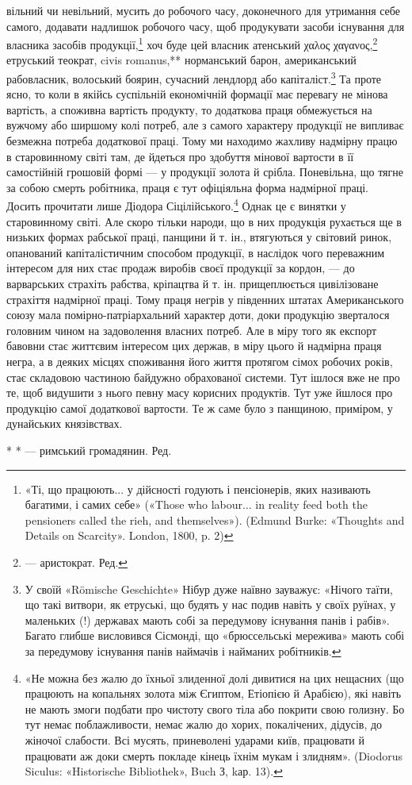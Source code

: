 \parcont{}  %
вільний чи невільний, мусить до робочого часу, доконечного для
утримання себе самого, додавати надлишок робочого часу, щоб
продукувати засоби існування для власника засобів продукції,\footnote{
«Ті, що працюють... у дійсності годують і пенсіонерів, яких називають
багатими, і самих себе» («Those who labour... in reality feed both
the pensioners called the rieh, and themselves»). (Edmund Burke: «Thoughts and
Details on Scarcity». London, 1800, p. 2)
}
хоч буде цей власник атенський χαλος χαγανος,\footnote*{
— аристократ. Ред.
} етруський теократ,
civis romanus,** норманський барон, американський рабовласник,
волоський боярин, сучасний лендлорд або капіталіст.\footnote{
У своїй «Römische Geschichte» Нібур дуже наївно зауважує: «Нічого
таїти, що такі витвори, як етруські, що будять у нас подив навіть у
своїх руїнах, у маленьких (!) державах мають собі за передумову існування
панів і рабів». Багато глибше висловився Сісмонді, що «брюссельські
мережива» мають собі за передумову існування панів наймачів і найманих
робітників.
}
Та проте ясно, то коли в якійсь суспільній економічній формації
має перевагу не мінова вартість, а споживна вартість продукту,
то додаткова праця обмежується на вужчому або ширшому колі
потреб, але з самого характеру продукції не випливає безмежна
потреба додаткової праці. Тому ми находимо жахливу надмірну
працю в старовинному світі там, де йдеться про здобуття мінової
вартости в її самостійній грошовій формі — у продукції золота
й срібла. Поневільна, що тягне за собою смерть робітника, праця
є тут офіціяльна форма надмірної праці. Досить прочитати лише
Діодора Сіцілійського.\footnote{
«Не можна без жалю до їхньої злиденної долі дивитися на цих нещасних
(що працюють на копальнях золота між Єгиптом, Етіопією й
Арабією), які навіть не мають змоги подбати про чистоту свого тіла або
покрити свою голизну. Бо тут немає поблажливости, немає жалю до
хорих, покалічених, дідусів, до жіночої слабости. Всі мусять, приневолені
ударами київ, працювати й працювати аж доки смерть покладе кінець
їхнім мукам і злидням». (Diodorus Siculus: «Historische Bibliothek», Buch З,
kар. 13).
} Однак це є винятки у старовинному
світі. Але скоро тільки народи, що в них продукція рухається
ще в низьких формах рабської праці, панщини й т. ін., втягуються
у світовий ринок, опанований капіталістичним способом продукції,
в наслідок чого переважним інтересом для них стає продаж виробів
своєї продукції за кордон, — до варварських страхіть рабства,
кріпацтва й т. ін. прищеплюється цивілізоване страхіття надмірної
праці. Тому праця негрів у південних штатах Американського
союзу мала помірно-патріархальний характер доти, доки продукцію
зверталося головним чином на задоволення власних потреб.
Але в міру того як експорт бавовни стає життєвим інтересом цих
держав, в міру цього й надмірна праця негра, а в деяких місцях
споживання його життя протягом сімох робочих років, стає складовою
частиною байдужно обрахованої системи. Тут ішлося вже
не про те, щоб видушити з нього певну масу корисних продуктів.
Тут уже йшлося про продукцію самої додаткової вартости. Те ж
саме було з панщиною, приміром, у дунайських князівствах.

* * — римський громадянин. Ред.
